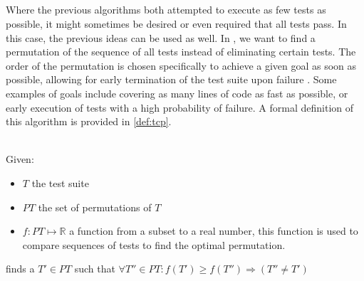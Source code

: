 
\subsection{\tcp{}}
Where the previous algorithms both attempted to execute as few tests as possible, it might sometimes be desired or even required that all tests pass. In this case, the previous ideas can be used as well. In \tcp{}, we want to find a permutation of the sequence of all tests instead of eliminating certain tests. The order of the permutation is chosen specifically to achieve a given goal as soon as possible, allowing for early termination of the test suite upon failure \cite{10.1002/stv.430}. Some examples of goals include covering as many lines of code as fast as possible, or early execution of tests with a high probability of failure. A formal definition of this algorithm is provided in \autoref{def:tcp}.

\begin{definition}[\tcp{}]
	\label{def:tcp}
	\mbox{}\\Given:
	\begin{itemize}
		\item $T$ the test suite
		\item $PT$ the set of permutations of $T$
		\item $f: PT \mapsto \mathbb{R}$ a function from a subset to a real number, this function is used to compare sequences of tests to find the optimal permutation.
	\end{itemize}
	
	\noindent \tcp{} finds a $T' \in PT$ such that $\forall T'' \in PT : f(T') \ge f(T'') \Rightarrow (T'' \ne T')$ 
\end{definition}